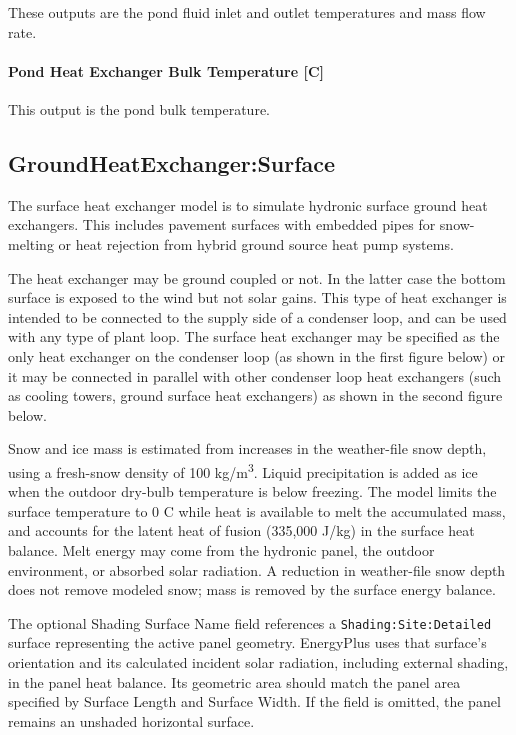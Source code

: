 These outputs are the pond fluid inlet and outlet temperatures and mass flow rate.

\paragraph{Pond Heat Exchanger Bulk Temperature {[}C{]}}\label{pond-heat-exchanger-bulk-temperature-c}

This output is the pond bulk temperature.

\subsection{GroundHeatExchanger:Surface}\label{groundheatexchangersurface}

The surface heat exchanger model is to simulate hydronic surface ground heat exchangers. This includes pavement surfaces with embedded pipes for snow-melting or heat rejection from hybrid ground source heat pump systems.

The heat exchanger may be ground coupled or not. In the latter case the bottom surface is exposed to the wind but not solar gains. This type of heat exchanger is intended to be connected to the supply side of a condenser loop, and can be used with any type of plant loop. The surface heat exchanger may be specified as the only heat exchanger on the condenser loop (as shown in the first figure below) or it may be connected in parallel with other condenser loop heat exchangers (such as cooling towers, ground surface heat exchangers) as shown in the second figure below.

Snow and ice mass is estimated from increases in the weather-file snow depth, using a fresh-snow density of 100 kg/m\textsuperscript{3}. Liquid precipitation is added as ice when the outdoor dry-bulb temperature is below freezing. The model limits the surface temperature to 0 C while heat is available to melt the accumulated mass, and accounts for the latent heat of fusion (335,000 J/kg) in the surface heat balance. Melt energy may come from the hydronic panel, the outdoor environment, or absorbed solar radiation. A reduction in weather-file snow depth does not remove modeled snow; mass is removed by the surface energy balance.

The optional Shading Surface Name field references a \texttt{Shading:Site:Detailed} surface representing the active panel geometry. EnergyPlus uses that surface's orientation and its calculated incident solar radiation, including external shading, in the panel heat balance. Its geometric area should match the panel area specified by Surface Length and Surface Width. If the field is omitted, the panel remains an unshaded horizontal surface.

